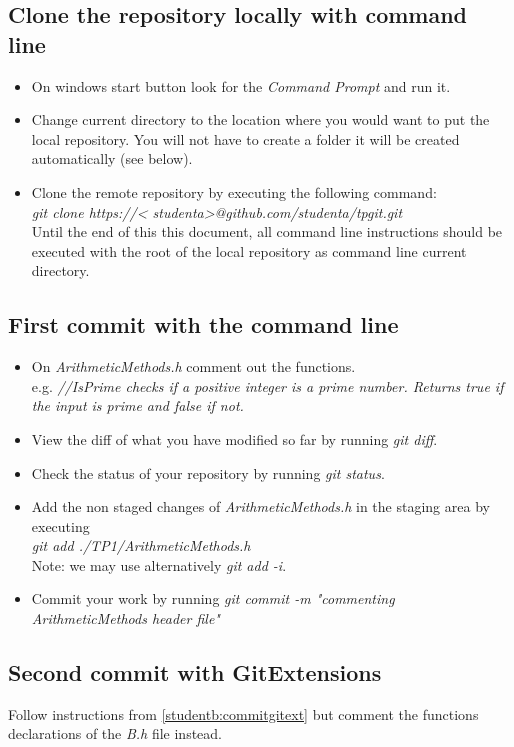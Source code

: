 \documentclass[11pt,amsfonts,amsmath]{article}
\begin{document}
\subsection{Clone the repository locally with command line}\label{studenta:clone}
\begin{itemize}
\item On windows start button look for the \emph{Command Prompt} and run it.
\item Change current directory to the location where you would want to put the local repository. You will not have to create a folder it will be created automatically (see below).
\item Clone the remote repository by executing  the following command:\\
\emph{git clone https://< studenta>@github.com/studenta/tpgit.git}\\
Until the end of this this document, all command line instructions should be executed with the root of the local repository as command line current directory.
\end{itemize}

\subsection{First commit with the command line}\label{studenta:commit}
\begin{itemize}
\item On \emph{ArithmeticMethods.h} comment out the functions.\\
e.g. \emph{//IsPrime checks if a positive integer is a prime number. Returns true if the input is prime and false if not.}
\item View the diff of what you have modified so far by running \emph{git diff}.
\item Check the status of your repository by running \emph{git status}.
\item Add the non staged changes of \emph{ArithmeticMethods.h} in the staging area by executing\\
\emph{git add ./TP1/ArithmeticMethods.h}\\
Note: we may use alternatively \emph{git add -i}.
\item Commit your work by running \emph{git commit -m "commenting ArithmeticMethods header file"}
\end{itemize}

\subsection{Second commit with \textbf{GitExtensions}}
Follow instructions from \ref{studentb:commitgitext} but comment the functions declarations of the \emph{B.h} file instead.
\end{document}
